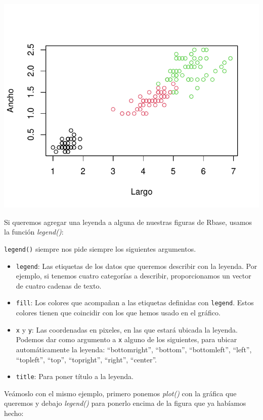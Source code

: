 \documentclass[
]{book}
\begin{document}
\begin{center}\includegraphics{_main_files/figure-latex/unnamed-chunk-192-1} \end{center}

Si queremos agregar una leyenda a alguna de nuestras figuras de Rbase, usamos la función \emph{legend()}:

\texttt{legend()} siempre nos pide siempre los siguientes argumentos.

\begin{itemize}
\item
  \texttt{legend}: Las etiquetas de los datos que queremos describir con la leyenda.
  Por ejemplo, si tenemos cuatro categorías a describir, proporcionamos un vector de cuatro cadenas de texto.
\item
  \texttt{fill}: Los colores que acompañan a las etiquetas definidas con \texttt{legend}.
  Estos colores tienen que coincidir con los que hemos usado en el gráfico.
\item
  \texttt{x} y \texttt{y}: Las coordenadas en pixeles, en las que estará ubicada la leyenda.
  Podemos dar como argumento a \texttt{x} alguno de los siguientes, para ubicar automáticamente la leyenda: ``bottomright'', ``bottom'', ``bottomleft'', ``left'', ``topleft'', ``top'', ``topright'', ``right'', ``center''.
\item
  \texttt{title}: Para poner título a la leyenda.
\end{itemize}

\hfill\break
Veámoslo con el mismo ejemplo, primero ponemos \emph{plot()} con la gráfica que queremos y debajo \emph{legend()} para ponerlo encima de la figura que ya habíamos hecho:\\
\end{document}

